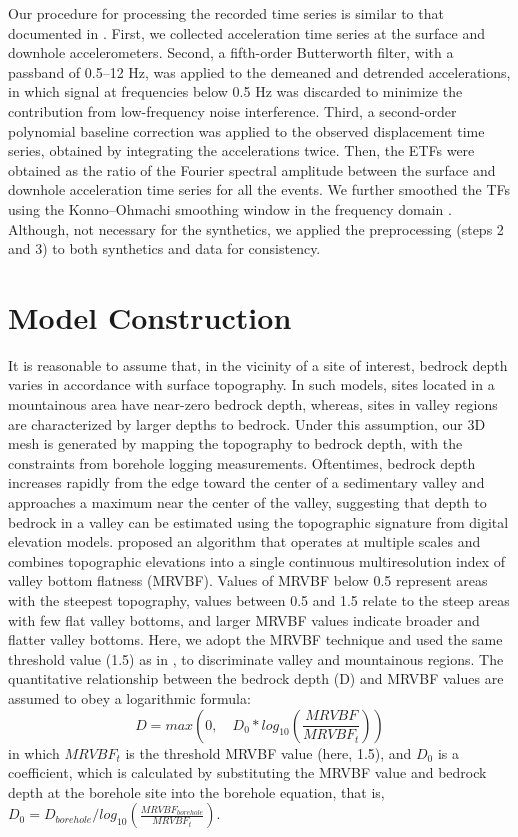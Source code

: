 Our procedure for processing the recorded time series is similar to that documented in \citet{taoInsightsModelingSmallstrain2019}. First, we collected acceleration time series at the surface and downhole accelerometers. Second, a fifth-order Butterworth filter, with a passband of 0.5–12 Hz, was applied to the demeaned and detrended accelerations, in which signal at frequencies below 0.5 Hz was discarded to minimize the contribution from low-frequency noise interference. Third, a second-order polynomial baseline correction was applied to the observed displacement time series, obtained by integrating the accelerations twice. Then, the ETFs were obtained as the ratio of the Fourier spectral amplitude between the surface and downhole acceleration time series for all the events. We further smoothed the TFs using the Konno–Ohmachi smoothing window in the frequency domain \citep{konnoGroundmotionCharacteristicsEstimated1998}. Although, not necessary for the synthetics, we applied the preprocessing (steps 2 and 3) to both synthetics and data for consistency.


\section{Model Construction}\label{etf:model}
It is reasonable to assume that, in the vicinity of a site of interest, bedrock depth varies in accordance with surface topography. In such models, sites located in a mountainous area have near-zero bedrock depth, whereas, sites in valley regions are characterized by larger depths to bedrock. Under this assumption, our 3D mesh is generated by mapping the topography to bedrock depth, with the constraints from borehole logging measurements. Oftentimes, bedrock depth increases
rapidly from the edge toward the center of a sedimentary valley and approaches a maximum near the center of the valley, suggesting that depth to bedrock in a valley can be estimated using the topographic signature from digital elevation models. \citet{gallantMultiresolutionIndexValley2003} proposed an algorithm that operates at multiple scales and combines topographic elevations into a single continuous multiresolution index of valley bottom flatness (MRVBF). Values of MRVBF below 0.5 represent areas with the steepest topography, values between 0.5 and 1.5 relate to the steep areas with few flat valley bottoms, and larger MRVBF values indicate broader and flatter valley bottoms. Here, we adopt the MRVBF technique and used the same threshold value (1.5) as in \citet{gallantMultiresolutionIndexValley2003}, to discriminate valley and mountainous regions. The quantitative relationship between the bedrock depth (D) and MRVBF values are assumed to obey a logarithmic formula:
\begin{equation}\label{eq:etf-3}
  D = max(0,\quad D_0 * log_{10}(\frac{MRVBF}{MRVBF_t}))
\end{equation}
\noindent in which $MRVBF_t$ is the threshold MRVBF value (here, 1.5), and $D_0$ is a coefficient, which is calculated by substituting the MRVBF value and bedrock depth at the borehole site into the borehole equation, that is, $D_0=D_{borehole}/log_{10}(\frac{MRVBF_{borehole}}{MRVBF_t})$.


